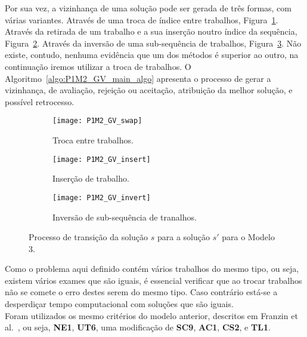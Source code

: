 Por sua vez, a vizinhança de uma solução pode ser gerada de três formas, com várias variantes. Através de uma troca de índice entre trabalhos, Figura~\ref{fig:P1M2_GV_swap}. Através da retirada de um trabalho e a sua inserção noutro índice da sequência, Figura~\ref{fig:P1M2_GV_insert}. Através da inversão de uma sub-sequência de trabalhos, Figura~\ref{fig:P1M2_GV_invert}. Não existe, contudo, nenhuma evidência que um dos métodos é superior ao outro, na continuação iremos utilizar a troca de trabalhos. O Algoritmo~\ref{algo:P1M2_GV_main_algo} apresenta o processo de gerar a vizinhança, de avaliação, rejeição ou aceitação, atribuição da melhor solução, e possível retrocesso.\\
\begin{figure}[H]
	\centering
	\begin{subfigure}{0.49\textwidth}
	\centering
		\texttt{[image: P1M2\_GV\_swap]}
		\caption{Troca entre trabalhos.}
		\label{fig:P1M2_GV_swap}
	\end{subfigure}
	\begin{subfigure}{0.49\textwidth}
	\centering
		\texttt{[image: P1M2\_GV\_insert]}
		\caption{Inserção de trabalho.}
		\label{fig:P1M2_GV_insert}
	\end{subfigure}
	\begin{subfigure}{0.49\textwidth}
	\centering
		\texttt{[image: P1M2\_GV\_invert]}
		\caption{Inversão de sub-sequência de tranalhos.}
		\label{fig:P1M2_GV_invert}
	\end{subfigure}
	\caption{Processo de transição da solução $s$ para a solução $s'$ para o Modelo 3.}
	\label{fig:P1M2_GV_gen}
\end{figure}

Como o problema aqui definido contém vários trabalhos do mesmo tipo, ou seja, existem vários exames que são iguais, é essencial verificar que ao trocar trabalhos não se comete o erro destes serem do mesmo tipo. Caso contrário está-se a desperdiçar tempo computacional com soluções que são iguais.\\

Foram utilizados os mesmo critérios do modelo anterior, descritos em Franzin et al.~\cite{franzinRevisitingSimulatedAnnealing2019}, ou seja, \textbf{NE1}, \textbf{UT6}, uma modificação de \textbf{SC9}, \textbf{AC1}, \textbf{CS2}, e \textbf{TL1}.\\

